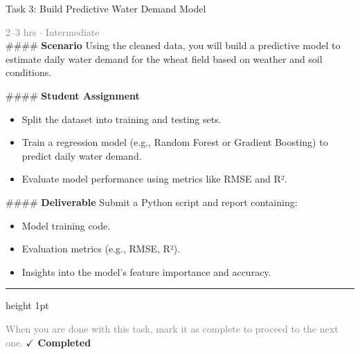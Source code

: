 \documentclass[10pt,a4paper]{article}
\begin{document}
\begin{taskbox}{Task 3: Build Predictive Water Demand Model}

    {\small \textcolor{gray}{2--3 hrs $\cdot$ Intermediate}}\\[12pt]

    \#\#\#\# \textbf{Scenario}  
Using the cleaned data, you will build a predictive model to estimate daily water demand for the wheat field based on weather and soil conditions.

\#\#\#\# \textbf{Student Assignment}  
\begin{itemize}
    \item Split the dataset into training and testing sets.
    \item Train a regression model (e.g., Random Forest or Gradient Boosting) to predict daily water demand.
    \item Evaluate model performance using metrics like RMSE and R².
\end{itemize}

\#\#\#\# \textbf{Deliverable}  
Submit a Python script and report containing:
\begin{itemize}
    \item Model training code.
    \item Evaluation metrics (e.g., RMSE, R²).
    \item Insights into the model’s feature importance and accuracy.\par
\end{itemize}

    \vspace{16pt}

    \textcolor{cardBorder}{\hrule height 1pt}\vspace{8pt}

    \small \textcolor{gray}{When you are done with this task, mark it as complete to proceed to the next one.} \hfill \textbf{\textcolor{brandDark}{$\checkmark$ Completed}}

\end{taskbox}
\end{document}
